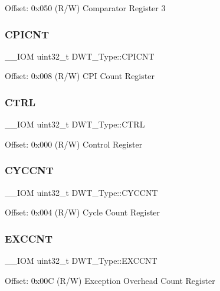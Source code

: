 Offset\+: 0x050 (R/W) Comparator Register 3 \mbox{\label{structDWT__Type_a2c08096c82abe245c0fa97badc458154}} 
\subsubsection{\texorpdfstring{CPICNT}{CPICNT}}
{\footnotesize\ttfamily \+\_\+\+\_\+\+I\+OM uint32\+\_\+t D\+W\+T\+\_\+\+Type\+::\+C\+P\+I\+C\+NT}

Offset\+: 0x008 (R/W) C\+PI Count Register \mbox{\label{structDWT__Type_add790c53410023b3b581919bb681fe2a}} 
\subsubsection{\texorpdfstring{CTRL}{CTRL}}
{\footnotesize\ttfamily \+\_\+\+\_\+\+I\+OM uint32\+\_\+t D\+W\+T\+\_\+\+Type\+::\+C\+T\+RL}

Offset\+: 0x000 (R/W) Control Register \mbox{\label{structDWT__Type_a102eaa529d9098242851cb57c52b42d9}} 
\subsubsection{\texorpdfstring{CYCCNT}{CYCCNT}}
{\footnotesize\ttfamily \+\_\+\+\_\+\+I\+OM uint32\+\_\+t D\+W\+T\+\_\+\+Type\+::\+C\+Y\+C\+C\+NT}

Offset\+: 0x004 (R/W) Cycle Count Register \mbox{\label{structDWT__Type_a9fe20c16c5167ca61486caf6832686d1}} 
\subsubsection{\texorpdfstring{EXCCNT}{EXCCNT}}
{\footnotesize\ttfamily \+\_\+\+\_\+\+I\+OM uint32\+\_\+t D\+W\+T\+\_\+\+Type\+::\+E\+X\+C\+C\+NT}

Offset\+: 0x00C (R/W) Exception Overhead Count Register \mbox{\label{structDWT__Type_a1cfc48384ebd8fd8fb7e5d955aae6c97}} 
